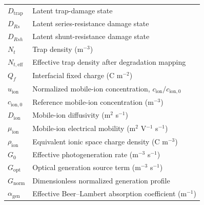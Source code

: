 \begin{tabular}{@{}p{}p{}@{}}
$D_{\mathrm{trap}}$ & Latent trap-damage state \\
$D_{Rs}$ & Latent series-resistance damage state \\
$D_{Rsh}$ & Latent shunt-resistance damage state \\
$N_t$ & Trap density (m$^{-3}$) \\
$N_{t,\mathrm{eff}}$ & Effective trap density after degradation mapping \\
$Q_f$ & Interfacial fixed charge (C m$^{-2}$) \\
$u_{\mathrm{ion}}$ & Normalized mobile-ion concentration, $c_{\mathrm{ion}}/c_{\mathrm{ion},0}$ \\
$c_{\mathrm{ion},0}$ & Reference mobile-ion concentration (m$^{-3}$) \\
$D_{\mathrm{ion}}$ & Mobile-ion diffusivity (m$^2$ s$^{-1}$) \\
$\mu_{\mathrm{ion}}$ & Mobile-ion electrical mobility (m$^2$ V$^{-1}$ s$^{-1}$) \\
$\rho_{\mathrm{ion}}$ & Equivalent ionic space charge density (C m$^{-3}$) \\
$G_0$ & Effective photogeneration rate (m$^{-3}$ s$^{-1}$) \\
$G_{\mathrm{opt}}$ & Optical generation source term (m$^{-3}$ s$^{-1}$) \\
$G_{\mathrm{norm}}$ & Dimensionless normalized generation profile \\
$\alpha_{\mathrm{gen}}$ & Effective Beer--Lambert absorption coefficient (m$^{-1}$) \\
\end{tabular}

\clearpage
